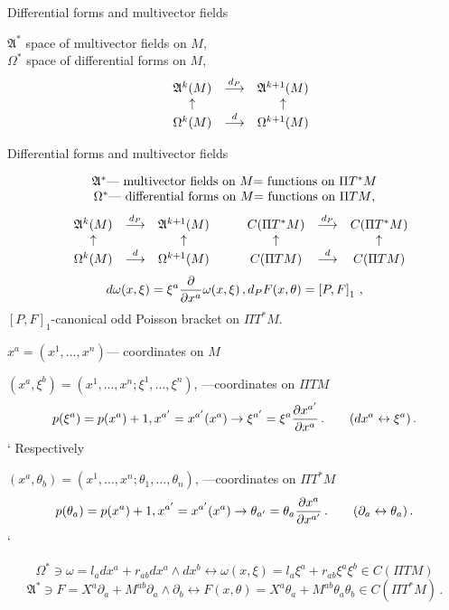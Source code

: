 \documentclass{beamer}
\def\w {{\omega}}
\def\p{\partial}
\def\p {\partial}
\begin{document}
\begin{frame}{Differential forms and multivector fields}

$\mathfrak {A}^*$ space of multivector fields on $M$,\\
$\Omega^*$ space of differential forms on $M$,
            $$
          \begin{matrix}
     &\mathfrak{A}^k(M)&{\buildrel d_P\over \longrightarrow} 
       &\mathfrak{A}^{k+1}(M)\cr
        &\uparrow& &\uparrow\cr 
     &\Omega^k(M)&{\buildrel d\over \longrightarrow} 
       &\Omega^{k+1}(M)\cr
        \end{matrix}
                  $$
      \end{frame}
\begin{frame}{Differential forms and multivector fields}

          $$
      \begin{matrix}
\hbox{$\mathfrak {A}^*$--- multivector fields on $M$=
                     functions on $\Pi T^*M$}\cr
\hbox{$\Omega^*$--- differential forms on $M$=
                     functions on $\Pi TM$},\cr
       \end{matrix}
         $$
            $$
          \begin{matrix}
     &\mathfrak{A}^k(M)&{\buildrel d_P\over \longrightarrow} 
       &\mathfrak{A}^{k+1}(M)\cr
        &\uparrow& &\uparrow\cr 
     &\Omega^k(M)&{\buildrel d\over \longrightarrow} 
       &\Omega^{k+1}(M)\cr
        \end{matrix}
        \qquad
           \begin{matrix}
     &C(\Pi T^*M)&{\buildrel d_P\over \longrightarrow} 
       &C(\Pi T^*M)\cr
        &\uparrow& &\uparrow\cr 
     &C(\Pi TM)&{\buildrel d\over \longrightarrow} 
       &C(\Pi TM)\cr
        \end{matrix}
            $$
            $$
d\w(x,\xi)=\xi^a{\p\over \p x^a} \w(x,\xi)\,,
 d_P F(x,\theta)=\left[P,F\right]_1\,,
           $$ 
$\left[P,F\right]_1$-canonical odd Poisson bracket on $\Pi T^*M$. 
\end{frame}
\begin{frame}
$x^a=(x^1,\dots,x^n)$--- coordinates on $M$ 

$(x^a,\xi^b)=(x^1,\dots,x^n;\xi^1,\dots,\xi^n)$, 
    ---coordinates on $\Pi TM$ 
          $$
p(\xi^a)=p(x^a)+1, x^{a'}=x^{a'}(x^a)\to \xi^{a'}=\xi^a{\p x^{a'}\over \p x^a}\,.
\qquad (dx^a\leftrightarrow \xi^a)\,.
           $$` 
  Respectively

$(x^a,\theta_b)=(x^1,\dots,x^n;\theta_1,\dots,\theta_n)$, 
    ---coordinates on $\Pi T^*M$ 
          $$
p(\theta_a)=p(x^a)+1, x^{a'}=x^{a'}(x^a)\to 
                           \theta_{a'}=
                           \theta_a{\p x^{a}\over \p x^{a'}}\,.
\qquad ({\p_a}\leftrightarrow \theta_a)\,.
           $$` 
\begin{example} 
  $$
\Omega^*\ni \w=l_adx^a+r_{ab}dx^a\wedge dx^b\leftrightarrow 
  \w(x,\xi)=l_a\xi^a+r_{ab}\xi^a\xi^b\in C(\Pi TM)
  $$
 $$
\mathfrak{A}^*\ni F=X^a\p_a+M^{ab}\p_a\wedge\p_b 
    \leftrightarrow 
  F(x,\theta)=X^a\theta_a+M^{ab}\theta_a\theta_b\in C(\Pi T^*M)\,.
  $$
 \end{example}
\end{frame}
\end{document}

